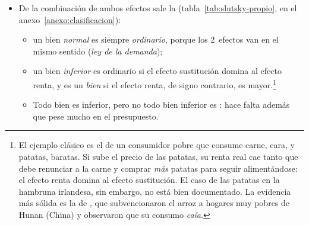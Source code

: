 \documentclass[11pt]{article}
\begin{document}
\begin{itemize}
\begin{itemize}
  \item El  mide la variación de la demanda debida al cambio del poder adquisitivo. Su signo depende del tipo de bien: al subir el precio cae la renta real, y el efecto renta es negativo para un bien normal y positivo para uno inferior. Su tamaño depende de lo que pesa el bien en el gasto.\footnote{En elasticidades, la ecuación de  es $\varepsilon_{x_i,p_j}=\varepsilon^{h}_{i,p_j}-s_j\,\varepsilon_{x_i,\overline{W}}$, donde $\varepsilon^{h}_{i,p_j}$ es la elasticidad de la demanda compensada (anexo~\ref{der:slutsky}). El efecto renta es tanto mayor cuanto mayor es la participación $s_j$ del bien cuyo precio cambia; para un bien que pesa poco en el presupuesto, demanda marshalliana y compensada casi coinciden.}
  \end{itemize}
\item De la combinación de ambos efectos sale la  (tabla~\ref{tab:slutsky-propio}, en el anexo~\ref{anexo:clasificacion}):
  \begin{itemize}
  \item un bien \emph{normal} es siempre \emph{ordinario}, porque los 2~efectos van en el mismo sentido (\emph{ley de la demanda});
  \item un bien \emph{inferior} es ordinario si el efecto sustitución domina al efecto renta, y es un \emph{bien } si el efecto renta, de signo contrario, es mayor.\footnote{El ejemplo clásico es el de un consumidor pobre que consume carne, cara, y patatas, baratas. Si sube el precio de las patatas, su renta real cae tanto que debe renunciar a la carne y comprar \emph{más} patatas para seguir alimentándose: el efecto renta domina al efecto sustitución. El caso de las patatas en la hambruna irlandesa, sin embargo, no está bien documentado\nocite{Rosen1999Potato}. La evidencia más sólida es la de \textcite{JensenMiller2008Giffen}, que subvencionaron el arroz a hogares muy pobres de Hunan (China) y observaron que su consumo \emph{caía}.}
  \item Todo bien  es inferior, pero no todo bien inferior es : hace falta además que pese mucho en el presupuesto.
  \end{itemize}
\end{itemize}
\end{document}
